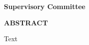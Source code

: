 \newpage
{}

\newcommand\panelist[3]{\noindent #1, #2\\\noindent(#3)\tpbreak}
\vfill
\noindent \textbf{Supervisory Committee}
\tpbreak
\panel

\begin{center}
\textbf{ABSTRACT}
\end{center}

Text

\vfill
\pagebreak
